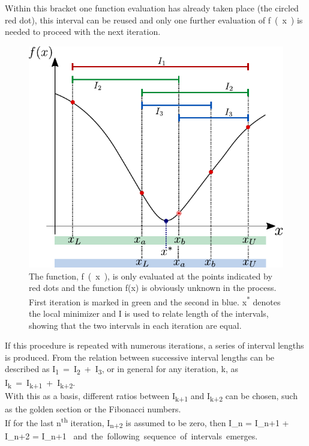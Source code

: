 Within this bracket one function evaluation has already taken place (the circled red dot), this interval can be reused and only one further evaluation of \si{f(x)} is needed to proceed with the next iteration.
%
\begin{figure}[H] 
	\centering
	\includegraphics[width=.5\textwidth]{figures/fibonacciIntervalSystem}
	\caption{The function, \si{f(x)}, is only evaluated at the points indicated by red dots and the function f(x) is obviously unknown in the process. First iteration is marked in green and the second in blue. \si{x^*} denotes the local minimizer and \si{I} is used to relate length of the intervals, showing that the two intervals in each iteration are equal.}
	\label{fibonacciIntervalSystem}
\end{figure}\vspace{-18pt}
%
If this procedure is repeated with numerous iterations, a series of interval lengths is produced. From  the relation between successive interval lengths can be described as \si{I_1 = I_2 + I_3}, or in general for any iteration, \si{k}, as \si{I_k = I_{k+1} + I_{k+2}}.\\
With this as a basis, different ratios between \si{I_{k+1}} and \si{I_{k+2}} can be chosen, such as the golden section or the Fibonacci numbers.\cite{AAntoniou}\\
If for the last \si{n^{th}} iteration, \si{I_{n+2}} is assumed to be zero, then \si{ I_n  = I_{n+1} + I_{n+2}  = I_{n+1} } and the following sequence of intervals emerges.
%
